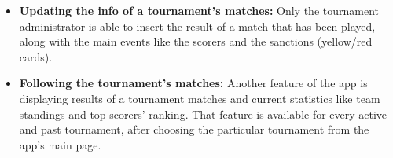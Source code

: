 \begin{itemize}
    \item \textbf{Updating the info of a tournament's matches:}
        Only the tournament administrator is able to insert the result of a match that has been played,
        along with the main events like the scorers and the sanctions (yellow/red cards).
        
    \item \textbf{Following the tournament's matches:}
        Another feature of the app is displaying results of a tournament matches and current statistics
        like team standings and top scorers' ranking. That feature is available for every active and past
        tournament, after choosing the particular tournament from the app's main page.

\end{itemize}
\newpage
